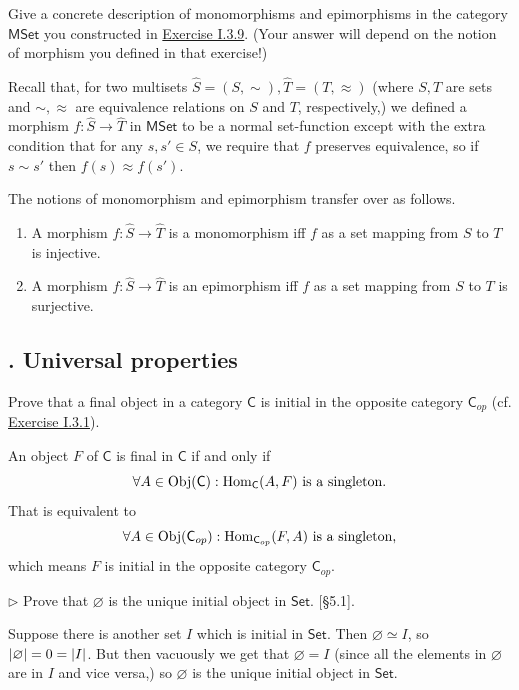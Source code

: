\begin{problem}[4.5]
	Give a concrete description of monomorphisms and epimorphisms in the category
	$\mathsf{MSet}$ you constructed in \hyperlink{Exercise I.3.9}{Exercise I.3.9}. (Your answer will depend on the notion
	of morphism you defined in that exercise!)
\end{problem}
\begin{solution}
	Recall that, for two multisets $\hat{S}=(S,\sim),\hat{T}=(T,\approx)$ (where
	$S,T$ are sets and $\sim,\approx$ are equivalence relations on $S$ and $T$,
	respectively,) we defined a morphism $f:\hat{S}\to\hat{T}$ in $\mathsf{MSet}$ to be a
	normal set-function except with the extra condition that for any $s,s'\in S$, we
	require that $f$ preserves equivalence, so if $s\sim s'$ then $f(s)\approx
	f(s')$.
	
	The notions of monomorphism and epimorphism transfer over as follows.
	
	\begin{enumerate}
		\item A morphism $f:\hat{S}\to\hat{T}$ is a monomorphism iff $f$ as a set mapping from $S$ to $T$ is injective.
		\item A morphism $f:\hat{S}\to\hat{T}$ is an epimorphism iff $f$ as a set mapping from $S$ to $T$ is surjective.
	\end{enumerate}
\end{solution}



\subsection{. Universal properties}
\begin{problem}[5.1]
	Prove that a final object in a category $\mathsf{C}$ is initial in the opposite category $\mathsf{C}_{op}$	(cf. \hyperlink{Exercise I.3.1}{Exercise I.3.1}).
\end{problem}
\begin{solution}
	An object $F$ of $\mathsf{C}$ is final in $\mathsf{C}$ if and only if
	\[
	\forall A \in \mathrm{Obj}(\mathsf{C}) : \mathrm{Hom}_\mathsf{C}(A,F) \text{ is a singleton.}
	\]
	That is equivalent to
	\[
	\forall A \in \mathrm{Obj}(\mathsf{C}_{op}) : \mathrm{Hom}_{\mathsf{C}_{op}}(F,A) \text{ is a singleton,}
	\]
	which means $F$ is initial in the opposite category $\mathsf{C}_{op}$.	
\end{solution}

\begin{problem}[5.2]
	\def \Set {\mathsf{Set}}
	$\rhd$ Prove that $\varnothing$ is the unique initial object in $\Set$. [\S 5.1].
\end{problem}
\begin{solution}
	\def \Set {\mathsf{Set}}
	Suppose there is another set $I$ which is initial in $\Set$. Then
	$\varnothing\simeq I$, so $\left|\varnothing\right| = 0 = \left|I\right|$. But then vacuously we
	get that $\varnothing = I$ (since all the elements in $\varnothing$ are in $I$ and
	vice versa,) so $\varnothing$ is the unique initial object in $\Set$.
\end{solution}


